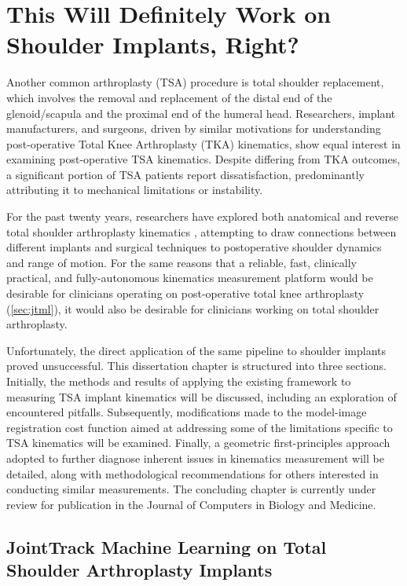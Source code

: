 \chapter{This Will Definitely Work on Shoulder Implants, Right?\protect\footnotemark}
Another common arthroplasty (TSA) procedure is total shoulder replacement, which involves the removal and replacement of the distal end of the glenoid/scapula and the proximal end of the humeral head.
Researchers, implant manufacturers, and surgeons, driven by similar motivations for understanding post-operative Total Knee Arthroplasty (TKA) kinematics, show equal interest in examining post-operative TSA kinematics.
Despite differing from TKA outcomes, a significant portion of TSA patients report dissatisfaction, predominantly attributing it to mechanical limitations or instability.

For the past twenty years, researchers have explored both anatomical and reverse total shoulder arthroplasty kinematics \cite{kijimaVivo3dimensionalAnalysis2015,matsukiVivo3DAnalysis2014,matsukiDynamicVivoGlenohumeral2012,sugiComparingVivoThreedimensional2021,burtonFullyAutomaticTracking2023}, attempting to draw connections between different implants and surgical techniques to postoperative shoulder dynamics and range of motion.
For the same reasons that a reliable, fast, clinically practical, and fully-autonomous kinematics measurement platform would be desirable for clinicians operating on post-operative total knee arthroplasty (\cref{sec:jtml}), it would also be desirable for clinicians working on total shoulder arthroplasty.

Unfortunately, the direct application of the same pipeline to shoulder implants proved unsuccessful.
This dissertation chapter is structured into three sections. Initially, the methods and results of applying the existing framework to measuring TSA implant kinematics will be discussed, including an exploration of encountered pitfalls.
Subsequently, modifications made to the model-image registration cost function aimed at addressing some of the limitations specific to TSA kinematics will be examined.
Finally, a geometric first-principles approach adopted to further diagnose inherent issues in kinematics measurement will be detailed, along with methodological recommendations for others interested in conducting similar measurements.
The concluding chapter is currently under review for publication in the Journal of Computers in Biology and Medicine.

\section{JointTrack Machine Learning on Total Shoulder Arthroplasty Implants}

